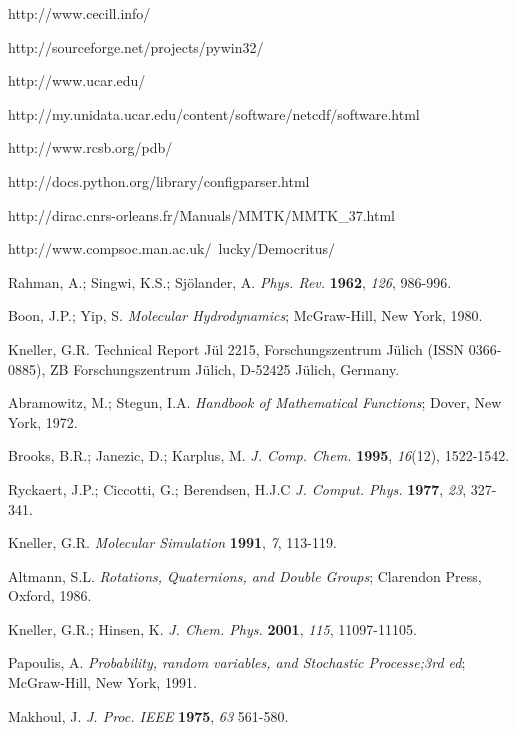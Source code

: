 \documentclass[a4paper,11pt]{article}
\begin{document}
\begin{thebibliography}{99}
 http://www.cecill.info/

 http://sourceforge.net/projects/pywin32/

 http://www.ucar.edu/

 http://my.unidata.ucar.edu/content/software/netcdf/software.html

 http://www.rcsb.org/pdb/

 http://docs.python.org/library/configparser.html

 http://dirac.cnrs-orleans.fr/Manuals/MMTK/MMTK\_37.html

 http://www.compsoc.man.ac.uk/~lucky/Democritus/

 Rahman, A.; Singwi, K.S.; Sj\"olander, A. \textit{Phys. Rev.} \textbf{1962}, \textit{126}, 986-996.

 Boon, J.P.; Yip, S. \textit{Molecular Hydrodynamics}; McGraw-Hill, New York, 1980.

 Kneller, G.R. Technical Report J\"ul 2215, Forschungs\-zen\-trum J\"u\-lich (ISSN 0366-0885), 
ZB Forschungs\-zen\-trum J\"ulich, D-52425 J\"ulich, Germany.

 Abramowitz, M.; Stegun, I.A. \textit{Handbook of Mathematical Functions}; Dover, New York, 1972.

 Brooks, B.R.; Janezic, D.; Karplus, M. \textit{J. Comp. Chem.} \textbf{1995}, \textit{16}(12), 1522-1542.

 Ryckaert, J.P.; Ciccotti, G.; Berendsen, H.J.C \textit{J. Comput. Phys.} \textbf{1977}, \textit{23}, 327-341.

 Kneller, G.R. \textit{Molecular Simulation} \textbf{1991}, \textit{7}, 113-119.

 Altmann, S.L. \textit{Rotations, Quaternions, and Double Groups}; Clarendon Press, Oxford, 1986.

 Kneller, G.R.; Hinsen, K. \textit{J. Chem. Phys.} \textbf{2001}, \textit{115}, 11097-11105.

 Papoulis, A. \textit{Probability, random variables, and Stochastic Processe;3rd ed}; McGraw-Hill, New York, 1991.

 Makhoul, J. \textit{J. Proc. IEEE} \textbf{1975}, \textit{63} 561-580.


\end{thebibliography}
\end{document}
